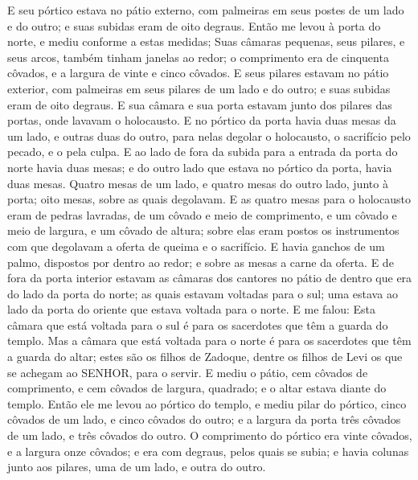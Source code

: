 {  E seu pórtico estava no pátio externo, com palmeiras em seus postes de um lado e do outro; e suas subidas eram de oito degraus.
  Então me levou à porta do norte, e mediu conforme a estas medidas;
  Suas câmaras pequenas, seus pilares, e seus arcos, também tinham janelas ao redor; o comprimento era de cinquenta côvados, e a largura de vinte e cinco côvados.
  E seus pilares estavam no pátio exterior, com palmeiras em seus pilares de um lado e do outro; e suas subidas eram de oito degraus.
  E sua câmara e sua porta estavam junto dos pilares das portas, onde lavavam o holocausto.
  E no pórtico da porta havia duas mesas da um lado, e outras duas do outro, para nelas degolar o holocausto, o sacrifício pelo pecado, e o
{} pela culpa.
  E ao lado de fora da subida para a entrada da porta do norte havia duas mesas; e do outro lado que estava no pórtico da porta, havia duas mesas.
  Quatro mesas de um lado, e quatro mesas do outro lado, junto à porta; oito mesas, sobre as quais degolavam.
  E as quatro mesas para o holocausto eram de pedras lavradas, de um côvado e meio de comprimento, e um côvado e meio de largura, e um côvado de altura; sobre elas eram postos os instrumentos com que degolavam a oferta de queima e o sacrifício.
  E havia ganchos de um palmo, dispostos por dentro ao redor; e sobre as mesas a carne da oferta.
  E de fora da porta interior estavam as câmaras dos cantores no pátio de dentro que era do lado da porta do norte; as quais estavam voltadas para o sul; uma estava ao lado da porta do oriente que estava voltada para o norte.
  E me falou: Esta câmara que está voltada para o sul é para os sacerdotes que têm a guarda do templo.
  Mas a câmara que está voltada para o norte é para os sacerdotes que têm a guarda do altar; estes são os filhos de Zadoque, dentre os filhos de Levi os que se achegam ao SENHOR, para o servir.
  E mediu o pátio, cem côvados de comprimento, e cem côvados de largura, quadrado; e o altar estava diante do templo.
  Então ele me levou ao pórtico do templo, e mediu
{} pilar do pórtico, cinco côvados de um lado, e cinco côvados do outro; e a largura da porta
{} três côvados de um lado, e três côvados do outro.
  O comprimento do pórtico era vinte côvados, e a largura onze côvados; e era com degraus, pelos quais se subia; e havia colunas junto aos pilares, uma de um lado, e outra do outro.
\par }

